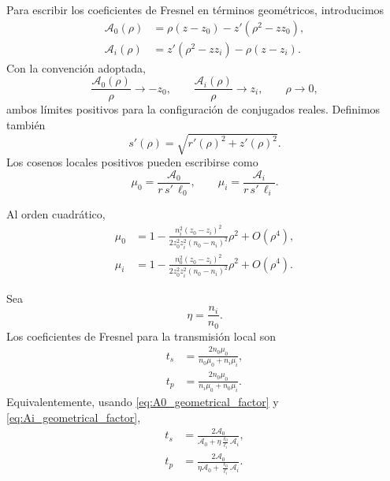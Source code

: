Para escribir los coeficientes de Fresnel en términos geométricos, introducimos
\begin{align}
\mathcal A_0(\rho)
&=
\rho\left(z-z_0\right)
-
z'\left(\rho^2-zz_0\right),
\label{eq:A0_geometrical_factor}
\\[6pt]
\mathcal A_i(\rho)
&=
z'\left(\rho^2-zz_i\right)
-
\rho\left(z-z_i\right).
\label{eq:Ai_geometrical_factor}
\end{align}
Con la convención adoptada,
\begin{equation}
\frac{\mathcal A_0(\rho)}{\rho}
\longrightarrow
-z_0,
\qquad
\frac{\mathcal A_i(\rho)}{\rho}
\longrightarrow
z_i,
\qquad
\rho\to0,
\label{eq:A0_Ai_axis_limits}
\end{equation}
ambos límites positivos para la configuración de conjugados reales. Definimos también
\begin{equation}
s'(\rho)
=
\sqrt{r'(\rho)^2+z'(\rho)^2}.
\label{eq:sprime_definition}
\end{equation}
Los cosenos locales positivos pueden escribirse como
\begin{equation}
\mu_0
=
\frac{\mathcal A_0}{r\,s'\,\ell_0},
\qquad
\mu_i
=
\frac{\mathcal A_i}{r\,s'\,\ell_i}.
\label{eq:positive_direction_cosines}
\end{equation}

Al orden cuadrático,
\begin{align}
\mu_0
&=
1
-
\frac{
n_i^2(z_0-z_i)^2
}{
2z_0^2z_i^2(n_0-n_i)^2
}
\rho^2
+
O(\rho^4),
\label{eq:mu0_series_second_order}
\\[6pt]
\mu_i
&=
1
-
\frac{
n_0^2(z_0-z_i)^2
}{
2z_0^2z_i^2(n_0-n_i)^2
}
\rho^2
+
O(\rho^4).
\label{eq:mui_series_second_order}
\end{align}

Sea
\begin{equation}
\eta=\frac{n_i}{n_0}.
\label{eq:eta_definition}
\end{equation}
Los coeficientes de Fresnel para la transmisión local son
\begin{align}
t_s
&=
\frac{
2n_0\mu_0
}{
n_0\mu_0+n_i\mu_i
},
\label{eq:fresnel_ts_cosine_form}
\\[6pt]
t_p
&=
\frac{
2n_0\mu_0
}{
n_i\mu_0+n_0\mu_i
}.
\label{eq:fresnel_tp_cosine_form}
\end{align}
Equivalentemente, usando \eqref{eq:A0_geometrical_factor} y \eqref{eq:Ai_geometrical_factor},
\begin{align}
t_s
&=
\frac{
2\mathcal A_0
}{
\mathcal A_0
+
\eta
\frac{\ell_0}{\ell_i}
\mathcal A_i
},
\label{eq:fresnel_ts_exact}
\\[8pt]
t_p
&=
\frac{
2\mathcal A_0
}{
\eta\mathcal A_0
+
\frac{\ell_0}{\ell_i}
\mathcal A_i
}.
\label{eq:fresnel_tp_exact}
\end{align}


